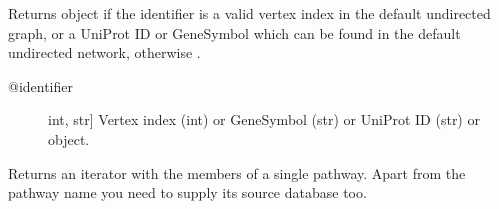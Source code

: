 \documentclass[letterpaper,10pt,english]{sphinxmanual}
\begin{document}
\begin{fulllineitems}
\begin{fulllineitems}
\begin{quote}
\begin{description}
\end{description}\end{quote}

\end{fulllineitems}


\begin{fulllineitems}
\label{\detokenize{reference:pypath.main.PyPath.p}}
Returns  object if the identifier
is a valid vertex index in the default undirected graph,
or a UniProt ID or GeneSymbol which can be found in the
default undirected network, otherwise .
\begin{description}
\item[{@identifier}] \leavevmode{[}int, str{]}
Vertex index (int) or GeneSymbol (str) or UniProt ID (str) or
 object.

\end{description}

\end{fulllineitems}


\begin{fulllineitems}
\label{\detokenize{reference:pypath.main.PyPath.pathway_attributes}}
\end{fulllineitems}


\begin{fulllineitems}
\label{\detokenize{reference:pypath.main.PyPath.pathway_members}}
Returns an iterator with the members of a single pathway.
Apart from the pathway name you need to supply its source
database too.

\end{fulllineitems}



\end{fulllineitems}
\end{document}
